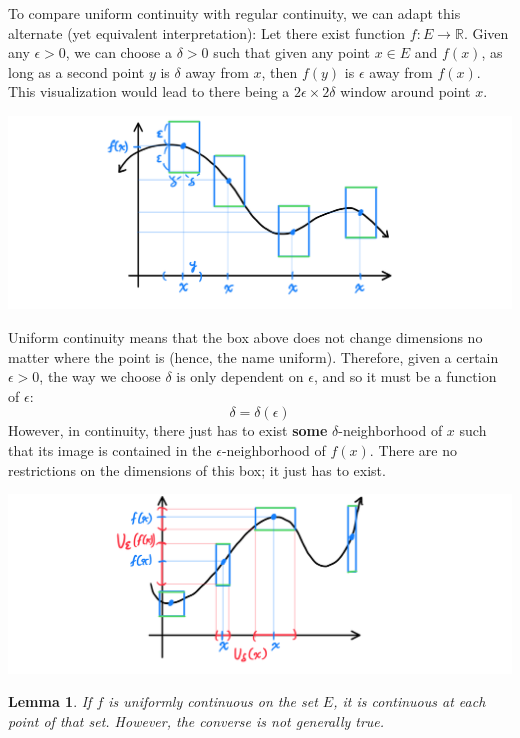\documentclass{article}
\newtheorem{lemma}[theorem]{Lemma}
\theoremstyle{remark}
\theoremstyle{definition}
\begin{document}
To compare uniform continuity with regular continuity, we can adapt this alternate (yet equivalent interpretation): Let there exist function $f: E \longrightarrow \mathbb{R}$. Given any $\epsilon>0$, we can choose a $\delta>0$ such that given any point $x \in E$ and $f(x)$, as long as a second point $y$ is $\delta$ away from $x$, then $f(y)$ is $\epsilon$ away from $f(x)$. This visualization would lead to there being a $2\epsilon \times 2\delta$ window around point $x$. 
\begin{center}
    \includegraphics[scale=0.3]{img/Double_Epsilon_Delta_Uniform_Continuity.PNG}
\end{center}
Uniform continuity means that the box above does not change dimensions no matter where the point is (hence, the name uniform). Therefore, given a certain $\epsilon > 0$, the way we choose $\delta$ is only dependent on $\epsilon$, and so it must be a function of $\epsilon$: 
\[\delta = \delta(\epsilon)\]
However, in continuity, there just has to exist \textbf{some} $\delta$-neighborhood of $x$ such that its image is contained in the $\epsilon$-neighborhood of $f(x)$. There are no restrictions on the dimensions of this box; it just has to exist. 
\begin{center}
    \includegraphics[scale=0.28]{img/Regular_Continuity_Box_Visual.PNG}
\end{center}

\begin{lemma}
If $f$ is uniformly continuous on the set $E$, it is continuous at each point of that set. However, the converse is not generally true. 
\end{lemma}
\end{document}
